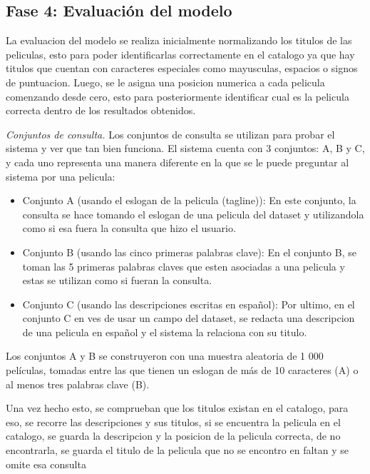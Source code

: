 ﻿\subsection{Fase 4: Evaluación del modelo}
La evaluacion del modelo se realiza inicialmente normalizando los titulos de las peliculas, esto para poder identificarlas correctamente en el catalogo ya que hay titulos que cuentan con caracteres especiales como mayusculas, espacios o signos de puntuacion. Luego, se le asigna una posicion numerica a cada pelicula comenzando desde cero, esto para posteriormente identificar cual es la pelicula correcta dentro de los resultados obtenidos.    

\textit{Conjuntos de consulta.}
Los conjuntos de consulta se utilizan para probar el sistema y ver que tan bien funciona. El sistema cuenta con 3 conjuntos: A, B y C, y cada uno representa una manera diferente en la que se le puede preguntar al sistema por una pelicula:

\begin{itemize}
    \item Conjunto A (usando el eslogan de la pelicula (tagline)): En este conjunto, la consulta se hace tomando el eslogan de una pelicula del dataset y utilizandola como si esa fuera la consulta que hizo el usuario.
    \item Conjunto B (usando las cinco primeras palabras clave): En el conjunto B, se toman las 5 primeras palabras claves que esten asociadas a una pelicula y estas se utilizan como si fueran la consulta. 
    \item Conjunto C (usando las descripciones escritas en español): Por ultimo, en el conjunto C en ves de usar un campo del dataset, se redacta una descripcion de una pelicula en español y el sistema la relaciona con su titulo.
\end{itemize}

Los conjuntos A y B se construyeron con una muestra aleatoria de 1 000 películas, tomadas entre las que tienen un eslogan de más de 10 caracteres (A) o al menos tres palabras clave (B).

Una vez hecho esto, se  comprueban que los titulos existan en el catalogo, para eso, se recorre las descripciones y sus titulos, si se encuentra la pelicula en el catalogo, se guarda la descripcion y la posicion de la pelicula correcta, de no encontrarla, se guarda el titulo de la pelicula que no se encontro en faltan y se omite esa consulta

